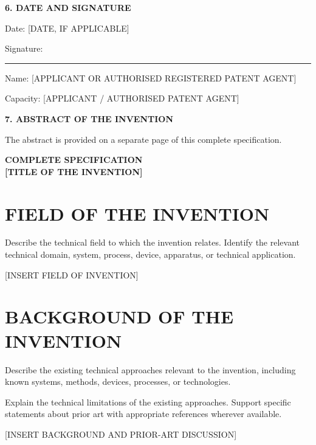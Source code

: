 \documentclass[12pt,a4paper]{article}
\newcommand{\InventionTitle}
{[TITLE OF THE INVENTION]}
\newcommand{\FilingDate}
{[DATE, IF APPLICABLE]}
\begin{document}
\vspace{3mm}

\textbf{6. DATE AND SIGNATURE}

Date: \FilingDate

Signature: \rule{55mm}{0.4pt}

Name: [APPLICANT OR AUTHORISED REGISTERED PATENT AGENT]

Capacity: [APPLICANT / AUTHORISED PATENT AGENT]

\vspace{3mm}

\textbf{7. ABSTRACT OF THE INVENTION}

The abstract is provided on a separate page of this
complete specification.

\newpage


\begin{center}
    \textbf{\Large COMPLETE SPECIFICATION}\\[6pt]
    \textbf{\InventionTitle}
\end{center}

\section{FIELD OF THE INVENTION}

Describe the technical field to which the invention
relates. Identify the relevant technical domain, system,
process, device, apparatus, or technical application.

[INSERT FIELD OF INVENTION]

\section{BACKGROUND OF THE INVENTION}

Describe the existing technical approaches relevant to
the invention, including known systems, methods, devices,
processes, or technologies.

Explain the technical limitations of the existing
approaches. Support specific statements about prior art
with appropriate references wherever available.

[INSERT BACKGROUND AND PRIOR-ART DISCUSSION]

\end{document}

